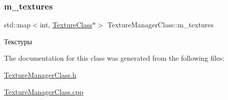 \subsubsection{\texorpdfstring{m\+\_\+textures}{m\_textures}}
{\footnotesize\ttfamily std\+::map$<$int, \hyperlink{class_texture_class}{Texture\+Class}$\ast$$>$ Texture\+Manager\+Class\+::m\+\_\+textures\hspace{0.3cm}{\ttfamily [private]}}



Текстуры 



The documentation for this class was generated from the following files\+:\begin{DoxyCompactItemize}
\item 
\hyperlink{_texture_manager_class_8h}{Texture\+Manager\+Class.\+h}\item 
\hyperlink{_texture_manager_class_8cpp}{Texture\+Manager\+Class.\+cpp}\end{DoxyCompactItemize}
